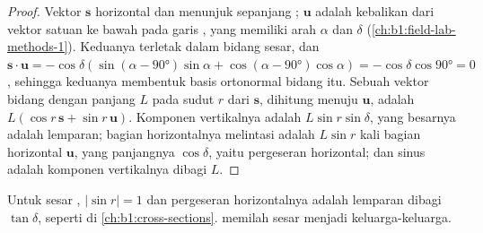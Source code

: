 \begin{proof}
Vektor $\mathbf s$ horizontal dan menunjuk sepanjang ; $\mathbf u$ adalah kebalikan dari vektor satuan ke bawah pada garis , yang memiliki arah $\alpha$ dan  $\delta$ (\cref{ch:b1:field-lab-methods-1}). Keduanya terletak dalam bidang sesar, dan $\mathbf s\cdot\mathbf u = -\cos\delta(\sin(\alpha -
\ang{90})\sin\alpha + \cos(\alpha - \ang{90})\cos\alpha) = -\cos\delta\cos\ang{90} = 0$,
sehingga keduanya membentuk basis ortonormal bidang itu. Sebuah vektor bidang dengan panjang $L$ pada sudut $r$ dari $\mathbf s$, dihitung menuju $\mathbf u$, adalah $L(\cos r\,\mathbf s + \sin r\,\mathbf u)$. Komponen vertikalnya adalah $L\sin r\sin\delta$, yang besarnya adalah lemparan; bagian horizontalnya melintasi  adalah $L\sin r$ kali bagian horizontal $\mathbf u$, yang panjangnya $\cos\delta$, yaitu pergeseran horizontal; dan sinus  adalah komponen vertikalnya dibagi $L$.
\end{proof}

Untuk sesar , $|\sin r| = 1$ dan pergeseran horizontalnya adalah lemparan dibagi $\tan\delta$, seperti di \cref{ch:b1:cross-sections}.  memilah sesar menjadi keluarga-keluarga.

